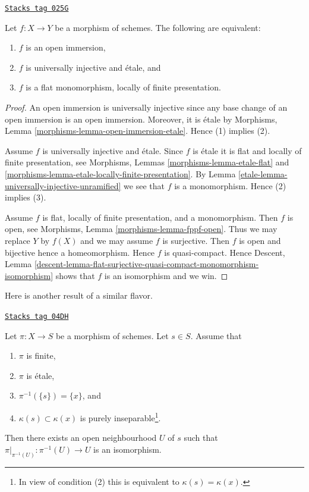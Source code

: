 \begin{theorem}
\label{etale-theorem-etale-radicial-open}
\href{https://stacks.math.columbia.edu/tag/025G}{\texttt{Stacks tag 025G}}

Let $f : X \to Y$ be a morphism of schemes.
The following are equivalent:
\begin{enumerate}
\item $f$ is an open immersion,
\item $f$ is universally injective and \'etale, and
\item $f$ is a flat monomorphism, locally of finite presentation.
\end{enumerate}
\end{theorem}

\begin{proof}

An open immersion is universally injective
since any base change of an open immersion
is an open immersion. Moreover, it is \'etale by
Morphisms, Lemma \ref{morphisms-lemma-open-immersion-etale}.
Hence (1) implies (2).

\medskip\noindent
Assume $f$ is universally injective and \'etale.
Since $f$ is \'etale it is flat and locally of finite presentation, see
Morphisms, Lemmas \ref{morphisms-lemma-etale-flat} and
\ref{morphisms-lemma-etale-locally-finite-presentation}.
By
Lemma \ref{etale-lemma-universally-injective-unramified}
we see that $f$ is a monomorphism. Hence (2) implies (3).

\medskip\noindent
Assume $f$ is flat, locally of finite presentation, and a monomorphism.
Then $f$ is open, see
Morphisms, Lemma \ref{morphisms-lemma-fppf-open}.
Thus we may replace $Y$ by $f(X)$ and we may assume $f$ is
surjective. Then $f$ is open and bijective hence a homeomorphism.
Hence $f$ is quasi-compact. Hence
Descent, Lemma
\ref{descent-lemma-flat-surjective-quasi-compact-monomorphism-isomorphism}
shows that $f$ is an isomorphism and we win.
\end{proof}

Here is another result of a similar flavor.

\begin{lemma}
\label{etale-lemma-finite-etale-one-point}
\href{https://stacks.math.columbia.edu/tag/04DH}{\texttt{Stacks tag 04DH}}

Let $\pi : X \to S$ be a morphism of schemes. Let $s \in S$.
Assume that
\begin{enumerate}
\item $\pi$ is finite,
\item $\pi$ is \'etale,
\item $\pi^{-1}(\{s\}) = \{x\}$, and
\item $\kappa(s) \subset \kappa(x)$ is purely
inseparable\footnote{In view of condition (2)
this is equivalent to $\kappa(s) = \kappa(x)$.}.
\end{enumerate}
Then there exists an open neighbourhood $U$ of $s$ such that
$\pi|_{\pi^{-1}(U)} : \pi^{-1}(U) \to U$ is an isomorphism.
\end{lemma}

